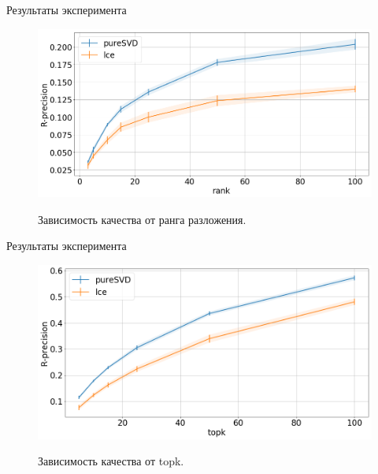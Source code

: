\documentclass{beamer}
\begin{document}
\begin{frame}{Результаты эксперимента}
\begin{figure}[ht]\center
\includegraphics[width=1\textwidth]{recall.pdf}\\
\caption{Зависимость качества от ранга разложения.}
\end{figure}
\end{frame}
\begin{frame}{Результаты эксперимента}
\begin{figure}[ht]\center
\includegraphics[width=1\textwidth]{recall2.pdf}\\
\caption{Зависимость качества от topk.}
\end{figure}
\end{frame}
\end{document}
